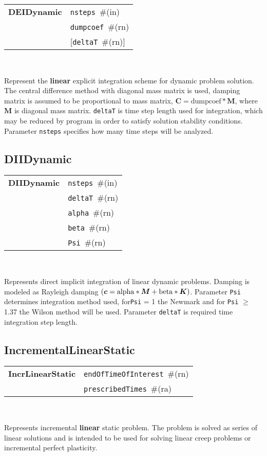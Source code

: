 \documentclass[a4paper]{article}
\newcommand{\mbf}[1]{\boldsymbol{#1}}
\newcommand{\param}[1]{\texttt{#1}} %
\newcommand{\optional}[1]{[#1]} %
\newcommand{\field}[2]{\param{#1}~\#{\tiny(#2)}} %
\newcommand{\optField}[2]{\optional{\field{#1}{#2}}}
\newcommand{\entKeywordInst}[1]{\textbf{#1}} %
\newenvironment{record}[1][]{\begin{tabular}{|ll}}{\end{tabular}\\}
\newcommand{\recentry}[2]{{#1}&{#2}\\}
\newcounter{rcc}
\newenvironment{record}[1][\textwidth]{\setcounter{rcc}{0}\rowcolors{1}{lightgray}{lightgray}\tabularx{#1}{llR} \hline}
               {\endtabularx}
\newcommand{\recentry}[2]{\ifthenelse{\value{rcc}>0}{$\backslash$ \\}{\setcounter{rcc}{1}}{#1}&{#2}&}
\begin{document}
\begin{record}
  \recentry{\entKeywordInst{DEIDynamic}}{\field{nsteps}{in}}
  \recentry{}{\field{dumpcoef}{rn}}
  \recentry{}{\optField{deltaT}{rn}}
\end{record}

Represent the \textbf{linear} explicit
integration scheme for dynamic problem solution. The central difference method with diagonal mass matrix is used,
damping matrix is assumed to be proportional to mass matrix, $\mbf{C} = \mathrm{dumpcoef} * \mbf{M}$, where
$\mbf{M}$ is diagonal mass matrix. \param{deltaT} is time step length used for
integration, which may be reduced by program in order to satisfy
solution stability conditions. Parameter \param{nsteps} specifies
how many time steps will be analyzed.

\subsection{DIIDynamic}
\label{DIIDynamic}

\begin{record}
  \recentry{\entKeywordInst{DIIDynamic}}{\field{nsteps}{in}}
  \recentry{}{\field{deltaT}{rn}}
  \recentry{}{\field{alpha}{rn}}
  \recentry{}{\field{beta}{rn}}
  \recentry{}{\field{Psi}{rn}}
\end{record}

Represents direct implicit integration of linear dynamic
problems. Damping is modeled as Rayleigh damping $(\mbf{c} =
\rm{alpha}*\mbf{M} + \rm{beta} * \mbf{K})$. Parameter \param{Psi} determines
integration method used, for\param{Psi} = 1 the Newmark and for \param{Psi} $\ge$ 1.37 the Wilson method
will be used. Parameter \param{deltaT} is required time integration
step length.

\subsection{IncrementalLinearStatic}
\label{IncrementalLinearStatic}

\begin{record}
  \recentry{\entKeywordInst{IncrLinearStatic}}{\field{endOfTimeOfInterest}{rn}}
  \recentry{}{\field{pre\-scri\-bed\-Ti\-mes}{ra}}
\end{record}


Represents incremental \textbf{linear} static problem.
The problem is solved as series of linear solutions and is intended to
be used for solving linear creep problems or incremental perfect plasticity.
\end{document}
